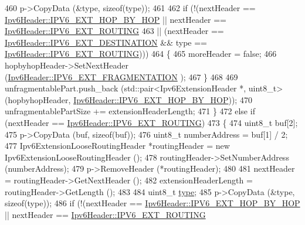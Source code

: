 \begin{DoxyCode}
460           p->CopyData (&type, \textcolor{keyword}{sizeof}(type));
461 
462           \textcolor{keywordflow}{if} (!(nextHeader == \hyperlink{classns3_1_1Ipv6Header_a226429221a066c5e3b1f260caf27d1e9aa0413202f88bebb4f91a138e317b6bbd}{Ipv6Header::IPV6\_EXT\_HOP\_BY\_HOP} || nextHeader 
      == \hyperlink{classns3_1_1Ipv6Header_a226429221a066c5e3b1f260caf27d1e9a4f6f9116305705bc2b3d04ff5c4bd2a8}{Ipv6Header::IPV6\_EXT\_ROUTING}
463                 || (nextHeader == \hyperlink{classns3_1_1Ipv6Header_a226429221a066c5e3b1f260caf27d1e9abfe6e82da1c9945685a3bf9dbfbe974b}{Ipv6Header::IPV6\_EXT\_DESTINATION} && type 
      == \hyperlink{classns3_1_1Ipv6Header_a226429221a066c5e3b1f260caf27d1e9a4f6f9116305705bc2b3d04ff5c4bd2a8}{Ipv6Header::IPV6\_EXT\_ROUTING})))
464             \{
465               moreHeader = \textcolor{keyword}{false};
466               hopbyhopHeader->SetNextHeader (\hyperlink{classns3_1_1Ipv6Header_a226429221a066c5e3b1f260caf27d1e9a5839daf3fdfb16dfdc94a208ca6ebc5a}{Ipv6Header::IPV6\_EXT\_FRAGMENTATION}
      );
467             \}
468 
469           unfragmentablePart.push\_back (std::pair<Ipv6ExtensionHeader *, uint8\_t> (hopbyhopHeader, 
      \hyperlink{classns3_1_1Ipv6Header_a226429221a066c5e3b1f260caf27d1e9aa0413202f88bebb4f91a138e317b6bbd}{Ipv6Header::IPV6\_EXT\_HOP\_BY\_HOP}));
470           unfragmentablePartSize += extensionHeaderLength;
471         \}
472       \textcolor{keywordflow}{else} \textcolor{keywordflow}{if} (nextHeader == \hyperlink{classns3_1_1Ipv6Header_a226429221a066c5e3b1f260caf27d1e9a4f6f9116305705bc2b3d04ff5c4bd2a8}{Ipv6Header::IPV6\_EXT\_ROUTING})
473         \{
474           uint8\_t buf[2];
475           p->CopyData (buf, \textcolor{keyword}{sizeof}(buf));
476           uint8\_t numberAddress = buf[1] / 2;
477           Ipv6ExtensionLooseRoutingHeader *routingHeader = \textcolor{keyword}{new} Ipv6ExtensionLooseRoutingHeader ();
478           routingHeader->SetNumberAddress (numberAddress);
479           p->RemoveHeader (*routingHeader);
480 
481           nextHeader = routingHeader->GetNextHeader ();
482           extensionHeaderLength = routingHeader->GetLength ();
483 
484           uint8\_t \hyperlink{visualizer-ideas_8txt_add98db9e15e2a58cf2b57623e7aa893a}{type};
485           p->CopyData (&type, \textcolor{keyword}{sizeof}(type));
486           \textcolor{keywordflow}{if} (!(nextHeader == \hyperlink{classns3_1_1Ipv6Header_a226429221a066c5e3b1f260caf27d1e9aa0413202f88bebb4f91a138e317b6bbd}{Ipv6Header::IPV6\_EXT\_HOP\_BY\_HOP} || nextHeader 
      == \hyperlink{classns3_1_1Ipv6Header_a226429221a066c5e3b1f260caf27d1e9a4f6f9116305705bc2b3d04ff5c4bd2a8}{Ipv6Header::IPV6\_EXT\_ROUTING}

\end{DoxyCode}
